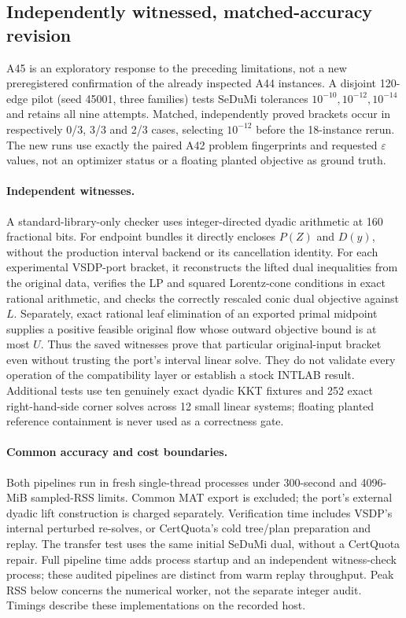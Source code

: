 \subsection{Independently witnessed, matched-accuracy revision}
\label{sec:results-a45}

A45 is an exploratory response to the preceding limitations, not a new
preregistered confirmation of the already inspected A44 instances. A disjoint
120-edge pilot (seed 45001, three families) tests SeDuMi tolerances
$10^{-10},10^{-12},10^{-14}$ and retains all nine attempts. Matched, independently
proved brackets occur in respectively 0/3, 3/3 and 2/3 cases, selecting
$10^{-12}$ before the 18-instance rerun. The new runs use exactly the paired
A42 problem fingerprints and requested $\varepsilon$ values, not an optimizer
status or a floating planted objective as ground truth.

\paragraph{Independent witnesses.}
A standard-library-only checker uses integer-directed dyadic arithmetic at
160 fractional bits. For endpoint bundles it directly encloses $P(Z)$ and
$D(y)$, without the production interval backend or its cancellation identity.
For each experimental VSDP-port bracket, it reconstructs the lifted dual
inequalities from the original data, verifies the LP and squared Lorentz-cone
conditions in exact rational arithmetic, and checks the correctly rescaled
conic dual objective against $L$. Separately,
exact rational leaf elimination of an exported primal midpoint supplies a
positive feasible original flow whose outward objective bound is at most $U$.
Thus the saved witnesses prove that particular original-input bracket even
without trusting the port's interval linear solve. They do not validate every
operation of the compatibility layer or establish a stock INTLAB result.
Additional tests use ten genuinely exact dyadic KKT fixtures and 252 exact
right-hand-side corner solves across 12 small linear systems; floating planted
reference containment is never used as a correctness gate.

\paragraph{Common accuracy and cost boundaries.}
Both pipelines run in fresh single-thread processes under 300-second and
4096-MiB sampled-RSS limits. Common MAT export is excluded; the port's external
dyadic lift construction is charged separately. Verification time includes
VSDP's internal perturbed re-solves, or CertQuota's cold tree/plan preparation
and replay. The transfer test uses the same initial SeDuMi dual, without a
CertQuota repair. Full pipeline time adds process startup and an independent
witness-check process; these audited pipelines are distinct from warm replay
throughput. Peak RSS below concerns the numerical worker, not the separate
integer audit. Timings describe these implementations on the recorded host.

